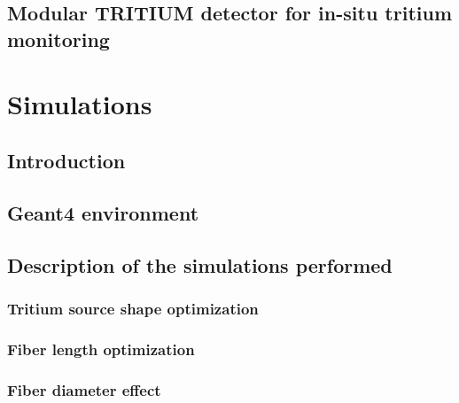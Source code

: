 \documentclass[12pt,a4paper]{book}
\begin{document}
	\section[Modular TRITIUM detector]{Modular TRITIUM detector for in-situ tritium monitoring}\label{sec:TritiumMonitor}
	
	\newpage

\chapter{Simulations}  \label{chap:Simulations}
	\section{Introduction}\label{sec:IntroSimulations}
	
	\newpage
	
	\section{Geant4 environment}\label{sec:Geant4Environment}
	
	\newpage
	
	\section{Description of the simulations performed}\label{sec:SimulationsPerformed}
	
	
		\subsection[Tritium source shape]{Tritium source shape optimization}\label{subsec:SourceShapeSimulation}
		
		
		\subsection[Fiber length]{Fiber length optimization}\label{subsec:FiberLengthSimulation}
		
				
		\subsection[Fiber diameter]{Fiber diameter effect}\label{subsec:FiberDiameterSimulation}
		
		
\end{document}
